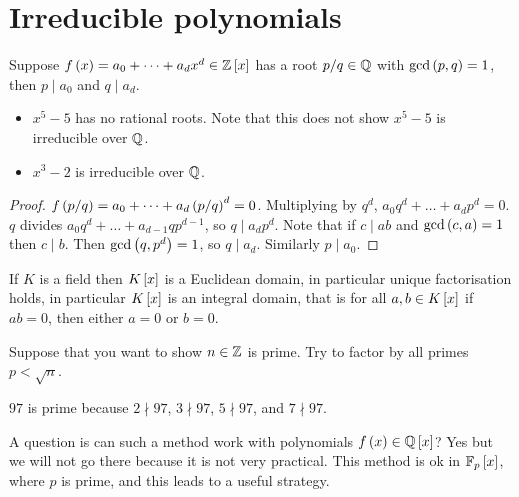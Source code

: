 \pagebreak

\section{Irreducible polynomials}


\begin{proposition}
Suppose $ f\rb{x} = a_0 + \dots + a_dx^d \in \Z\sb{x} $ has a root $ p / q \in \Q $ with $ \gcd\rb{p, q} = 1 $, then $ p \mid a_0 $ and $ q \mid a_d $.
\end{proposition}

\begin{example*}
\hfill
\begin{itemize}
\item $ x^5 - 5 $ has no rational roots. Note that this does not show $ x^5 - 5 $ is irreducible over $ \Q $.
\item $ x^3 - 2 $ is irreducible over $ \Q $.
\end{itemize}
\end{example*}

\begin{proof}
$ f\rb{p / q} = a_0 + \dots + a_d\rb{p / q}^d = 0 $. Multiplying by $ q^d $, $ a_0q^d + \dots + a_dp^d = 0 $. $ q $ divides $ a_0q^d + \dots + a_{d - 1}qp^{d - 1} $, so $ q \mid a_dp^d $. Note that if $ c \mid ab $ and $ \gcd\rb{c, a} = 1 $ then $ c \mid b $. Then $ \gcd\rb{q, p^d} = 1 $, so $ q \mid a_d $. Similarly $ p \mid a_0 $.
\end{proof}

\begin{remark*}
If $ K $ is a field then $ K\sb{x} $ is a Euclidean domain, in particular unique factorisation holds, in particular $ K\sb{x} $ is an integral domain, that is for all $ a, b \in K\sb{x} $ if $ ab = 0 $, then either $ a = 0 $ or $ b = 0 $.
\end{remark*}

Suppose that you want to show $ n \in \Z $ is prime. Try to factor by all primes $ p < \sqrt{n} $.

\begin{example*}
$ 97 $ is prime because $ 2 \nmid 97 $, $ 3 \nmid 97 $, $ 5 \nmid 97 $, and $ 7 \nmid 97 $.
\end{example*}

A question is can such a method work with polynomials $ f\rb{x} \in \Q\sb{x} $? Yes but we will not go there because it is not very practical. This method is ok in $ \F_p\sb{x} $, where $ p $ is prime, and this leads to a useful strategy.


